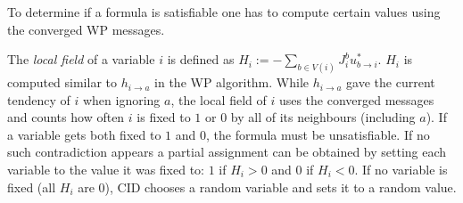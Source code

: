 To determine if a formula is satisfiable one has to compute certain values using the converged WP messages.

The \emph{local field} of a variable $i$ is defined as $H_i := - \sum_{b \in V(i)} J_i^b u^\ast_{b\rightarrow i}$. \newline $H_i$ is computed similar to $h_{i \rightarrow a}$ in the WP algorithm. While 
$h_{i \rightarrow a}$ gave the current tendency of $i$ when ignoring $a$, the local field of $i$ uses the converged messages and counts how often $i$ is fixed to $1$ or $0$ by all of its neighbours (including $a$). \newline
If a variable gets both fixed to $1$ and $0$, the formula must be unsatisfiable. \newline
If no such contradiction appears a partial assignment can be obtained by setting each variable to the value it was fixed to: $1$ if $H_i > 0$ and $0$ if $H_i < 0$. If no variable is fixed (all $H_i$ are $0$), CID chooses a random variable and sets it to a random value.





\newpage